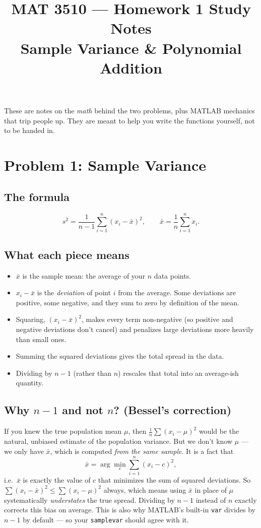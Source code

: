\documentclass[11pt]{article}
\title{MAT 3510 --- Homework 1 Study Notes\\
\large Sample Variance \& Polynomial Addition}
\author{}
\date{}
\begin{document}
\maketitle

These are notes on the \emph{math} behind the two problems, plus MATLAB
mechanics that trip people up. They are meant to help you write the
functions yourself, not to be handed in.

\section*{Problem 1: Sample Variance}

\subsection*{The formula}
\[
  s^2 = \frac{1}{n-1}\sum_{i=1}^n (x_i - \bar x)^2,
  \qquad
  \bar x = \frac{1}{n}\sum_{i=1}^n x_i .
\]

\subsection*{What each piece means}
\begin{itemize}
  \item $\bar x$ is the sample mean: the average of your $n$ data points.
  \item $x_i - \bar x$ is the \emph{deviation} of point $i$ from the average.
        Some deviations are positive, some negative, and they sum to zero
        by definition of the mean.
  \item Squaring, $(x_i-\bar x)^2$, makes every term non-negative (so
        positive and negative deviations don't cancel) and penalizes large
        deviations more heavily than small ones.
  \item Summing the squared deviations gives the total spread in the data.
  \item Dividing by $n-1$ (rather than $n$) rescales that total into an
        average-ish quantity.
\end{itemize}

\subsection*{Why $n-1$ and not $n$? (Bessel's correction)}
If you knew the true population mean $\mu$, then
$\frac{1}{n}\sum (x_i-\mu)^2$ would be the natural, unbiased estimate of
the population variance. But we don't know $\mu$ --- we only have
$\bar x$, which is computed \emph{from the same sample}. It is a fact
that
\[
  \bar x = \arg\min_c \sum_{i=1}^n (x_i - c)^2,
\]
i.e.\ $\bar x$ is exactly the value of $c$ that minimizes the sum of
squared deviations. So $\sum (x_i - \bar x)^2 \le \sum (x_i - \mu)^2$
always, which means using $\bar x$ in place of $\mu$ systematically
\emph{understates} the true spread. Dividing by $n-1$ instead of $n$
exactly corrects this bias on average. This is also why MATLAB's
built-in \texttt{var} divides by $n-1$ by default --- so your
\texttt{samplevar} should agree with it.
\end{document}
